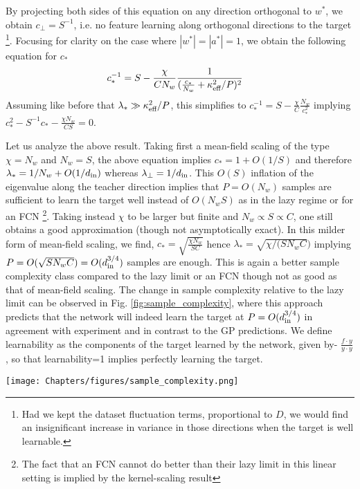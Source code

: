 By projecting both sides of this equation on any direction orthogonal to $w^*$, we obtain $c_{\perp}=S^{-1}$, i.e. no feature learning along orthogonal directions to the target \footnote{Had we kept the dataset fluctuation terms, proportional to $D$, we would find an insignificant increase in variance in those directions when the target is well learnable.}. Focusing for clarity on the case where $|{w}^*|=|{a}^*|=1$, we obtain the following equation for $c_*$ 
\begin{align}
c^{-1}_* &= S - \frac{\chi}{CN_w}\frac{1}{(\frac{c_*}{N_w}+ \kappa_{\text{eff}}^2/P)^2}  
\end{align}
Assuming like before that $\lambda_* \gg \kappa^2_{\text{eff}}/P$, this simplifies to $c^{-1}_* = S - \frac{\chi}{C} \frac{N_w}{c^2_*}$ implying $c^2_*- S^{-1}c_* - \frac{\chi N_w}{C S}=0$. 

Let us analyze the above result. Taking first a mean-field scaling of the type $\chi=N_w$ and $N_w=S$, the above equation implies $c_* = 1 + O(1/S)$ and therefore $\lambda_* = 1/N_w + O(1/d_{\text{in}})$ whereas $\lambda_{\perp}=1/d_{\text{in}}$. This $O(S)$ inflation of the eigenvalue along the teacher direction implies that $P=O(N_w)$ samples are sufficient to learn the target well instead of $O(N_w S)$ as in the lazy regime or for an FCN \footnote{The fact that an FCN cannot do better than their lazy limit in this linear setting is implied by the kernel-scaling result}. Taking instead $\chi$ to be larger but finite and $N_w \propto S \propto C$, one still obtains a good approximation (though not asymptotically exact). In this milder form of mean-field scaling, we find, $c_* = \sqrt{ \frac{\chi N_w}{SC}}$ hence $\lambda_* = \sqrt{\chi/(SN_w C})$ implying $P=O(\sqrt{SN_w C})=O(d_{\text{in}}^{3/4})$ samples are enough. This is again a better sample complexity class compared to the lazy limit or an FCN though not as good as that of mean-field scaling. The change in sample complexity relative to the lazy limit can be observed in Fig. \ref{fig:sample_complexity}, where this approach predicts that the network will indeed learn the target at $P=O(d_{\text{in}}^{3/4})$ in agreement with experiment and in contrast to the GP predictions. We define learnability as the components of the target learned by the network, given by- $\frac{ f \cdot y}{ y \cdot y}$, so that learnability=1 implies perfectly learning the target. 





\begin{figure*}[t]
\vskip 0.2in
\begin{centering}
\texttt{[image: Chapters/figures/sample\_complexity.png]}\caption{Learnability of linear CNNs as a function of $P$. We take $S,N,C \propto \alpha$, and consider different $\alpha$ scales of these parameters. Here the network is observed to learn the target at $P\propto d^{3/4}$, regardless of the parameter scale, as opposed to the GP predictions which predict learning at $P\propto d$. Parameters: $\chi=100$, $N=10\alpha,S=50\alpha,C=1000\alpha$.}
\label{fig:sample_complexity}
\par\end{centering}
\vskip -0.2in
\end{figure*}

